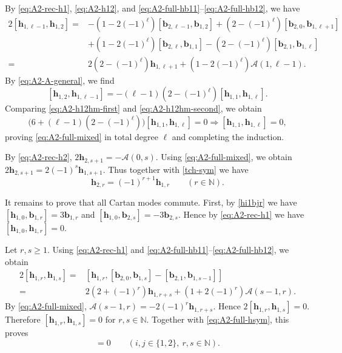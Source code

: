 \documentclass[11pt,reqno]{amsart}
\numberwithin{equation}{section}
\theoremstyle{definition}
\theoremstyle{remark}
\newcommand{\bN}{\mathbb{N}}
\newcommand{\bb}{\mathbf{b}}
\newcommand{\bh}{\mathbf{h}}
\newcommand{\gge}{\geqslant}
\begin{document}
By \eqref{eq:A2-rec-h1}, \eqref{eq:A2-h12}, and \eqref{eq:A2-full-hb11}--\eqref{eq:A2-full-hb12}, we have
\begin{align*}
2[\bh_{1,\ell-1},\bh_{1,2}]
={}&
-(1-2(-1)^\ell)[\bb_{2,\ell-1},\bb_{1,2}]
+
(2-(-1)^\ell)[\bb_{2,0},\bb_{1,\ell+1}]
\\
&
+(1-2(-1)^\ell)[\bb_{2,\ell},\bb_{1,1}]
-
(2-(-1)^\ell)[\bb_{2,1},\bb_{1,\ell}]
\\
={}&
2(2-(-1)^\ell)\bh_{1,\ell+1}
+(1-2(-1)^\ell)\mathscr A(1,\ell-1).
\end{align*}
By \eqref{eq:A2-A-general}, we find
\begin{equation}\label{eq:A2-h12hm-second}
[\bh_{1,2},\bh_{1,\ell-1}]
=
-(\ell-1)(2-(-1)^\ell)[\bh_{1,1},\bh_{1,\ell}].
\end{equation}
Comparing
\eqref{eq:A2-h12hm-first} and
\eqref{eq:A2-h12hm-second}, we obtain
\begin{equation*}
\bigl(6+(\ell-1)(2-(-1)^\ell)\bigr)[\bh_{1,1},\bh_{1,\ell}]=0\Longrightarrow [\bh_{1,1},\bh_{1,\ell}]=0,
\end{equation*}
proving \eqref{eq:A2-full-mixed} in total degree $\ell$ and
completing the induction.

By \eqref{eq:A2-rec-h2}, $2\bh_{2,s+1}
=
-\mathscr A(0,s)$. Using \eqref{eq:A2-full-mixed}, we obtain $2\bh_{2,s+1}
=
2(-1)^s\bh_{1,s+1}$. Thus together with \eqref{tch-sym} we have
\begin{equation}\label{eq:A2-full-hsym}
\bh_{2,r}
=
(-1)^{r+1}\bh_{1,r}
\qquad
(r\in\bN).
\end{equation}

It remains to prove that all Cartan modes commute.  First, by \eqref{hi1bjr} we have $[\bh_{1,0},\bb_{1,r}]=3\bb_{1,r}$ and $[\bh_{1,0},\bb_{2,s}]=-3\bb_{2,s}$. Hence by \eqref{eq:A2-rec-h1} we have $[\bh_{1,0},\bh_{1,r}]=0$.

Let $r,s\gge1$.  Using \eqref{eq:A2-rec-h1} and
\eqref{eq:A2-full-hb11}--\eqref{eq:A2-full-hb12}, we obtain
\begin{align*}
2[\bh_{1,r},\bh_{1,s}]
={}&
[\bh_{1,r},
[\bb_{2,0},\bb_{1,s}]
-
[\bb_{2,1},\bb_{1,s-1}]
]
\\
={}&
2(2+(-1)^r)\bh_{1,r+s}
+(1+2(-1)^r)\mathscr A(s-1,r).
\end{align*}
By \eqref{eq:A2-full-mixed}, $\mathscr A(s-1,r)
=
-2(-1)^r\bh_{1,r+s}$. Hence $2[\bh_{1,r},\bh_{1,s}]=0$.
Therefore $[\bh_{1,r},\bh_{1,s}]
=
0$
for $r,s\in\bN$.
Together with \eqref{eq:A2-full-hsym}, this proves
\begin{equation*}
[\bh_{i,r},\bh_{j,s}]=0
\qquad
(i,j\in\{1,2\},\ r,s\in\bN).
\end{equation*}
\end{document}
